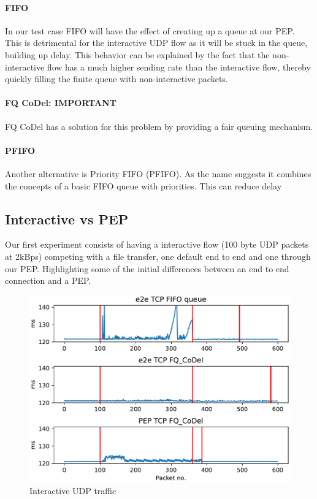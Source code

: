 \documentclass[a4paper,english, 11pt]{report}
\begin{document}
\paragraph{FIFO}
In our test case FIFO will have the effect of creating up a queue at our PEP. This is detrimental for the interactive UDP flow as it will be stuck in the queue, building up delay. This behavior can be explained by the fact that the non-interactive flow has a much higher sending rate than the interactive flow, thereby quickly filling the finite queue with non-interactive packets.

\paragraph{FQ CoDel: IMPORTANT}
FQ CoDel has a solution for this problem by providing a fair queuing mechanism. 
\paragraph{PFIFO}
Another alternative is Priority FIFO (PFIFO). As the name suggests it combines the concepts of a basic FIFO queue with priorities. This can reduce delay


\subsection{Interactive vs PEP}
Our first experiment consists of having a interactive flow (100 byte UDP packets at 2kBps) competing with a file transfer, one default end to end and one through our PEP. Highlighting some of the initial differences between an end to end connection and a PEP.\\


\begin{figure}[h] %
	\centering
	\includegraphics[scale=0.50]{../diagrams/graphs/initial_udp_latency_timeseries.pdf}
  	\caption{Interactive UDP traffic}
  	\label{fig:inital_test}
\end{figure}
\end{document}

